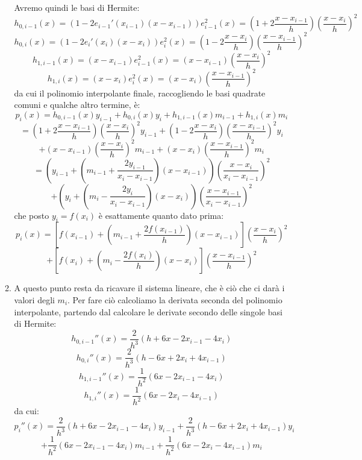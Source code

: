 \documentclass[a4paper,11pt]{article}
\begin{document}
\begin{itemize}
\begin{enumerate}
				Avremo quindi le basi di Hermite:
				$$
				h_{0,i-1}\left(x\right) = (1 - 2e_{i - 1}'(x_{i - 1})(x - x_{i-1}))e_{i-1}^2(x) 
				= \left(1+2\frac{x - x_{i-1}}{h}\right)\left(\frac{x-x_{i}}{h}\right)^{2}
				$$
				$$
				h_{0,i}\left(x\right) = (1 - 2e_{i}'(x_i)(x - x_i))e_i^2(x) 
				= \left(1-2\frac{x - x_i}{h}\right)\left(\frac{x-x_{i-1}}{h}\right)^{2}
				$$
				$$
				h_{1,i-1}\left(x\right) = (x - x_{i - 1})e_{i-1}^2(x) = \left(x-x_{i-1}\right)\left(\frac{x-x_{i}}{h}\right)^{2}
				$$
				$$
				h_{1,i}\left(x\right) = (x - x_{i})e_{i}^2(x) = \left(x-x_{i}\right)\left(\frac{x-x_{i-1}}{h}\right)^{2}
				$$
				da cui il polinomio interpolante finale, raccogliendo le basi quadrate comuni e qualche altro termine, è:
				$$
				p_i\left(x\right)=h_{0,i-1}\left(x\right)y_{i-1}+h_{0,i}\left(x\right)y_{i}+h_{1,i-1}\left(x\right)m_{i-1}+h_{1,i}\left(x\right)m_{i}
				$$
				$$
				= \left(1+2\frac{x - x_{i-1}}{h}\right)\left(\frac{x-x_{i}}{h}\right)^{2} y_{i - 1}
				+ \left(1-2\frac{x - x_i}{h}\right)\left(\frac{x-x_{i-1}}{h}\right)^{2} y_i
				$$
				$$
				+ \left(x-x_{i-1}\right)\left(\frac{x-x_{i}}{h}\right)^{2} m_{i - 1}
				+ \left(x-x_{i}\right)\left(\frac{x-x_{i-1}}{h}\right)^{2} m_i
				$$
				$$
				=\left(y_{i-1}+\left(m_{i-1}+\frac{2y_{i-1}}{x_{i}-x_{i-1}}\right)\left(x-x_{i-1}\right)\right)\left(\frac{x-x_{i}}{x_{i}-x_{i-1}}\right)^{2}
				$$
				$$
				+\left(y_{i}+\left(m_{i}-\frac{2y_{i}}{x_{i}-x_{i-1}}\right)\left(x-x_{i}\right)\right)\left(\frac{x-x_{i-1}}{x_{i}-x_{i-1}}\right)^{2}
				$$
				che posto $y_i = f(x_i)$ è esattamente quanto dato prima:
				$$
				p_i(x) = \left[ f(x_{i - 1}) + \left( m_{i - 1} + \frac{2 f(x_{i - 1})}{h} \right) (x - x_{i - 1})  \right] \left( \frac{x - x_i}{h} \right)^2
				$$
				$$
				+ \left[ f(x_{i}) + \left( m_{i} - \frac{2 f(x_{i })}{h} \right) (x - x_{i})  \right] \left( \frac{x - x_{i - 1}}{h} \right)^2
				$$

			\item
				A questo punto resta da ricavare il sistema lineare, che è ciò che ci darà i valori degli $m_i$.
				Per fare ciò calcoliamo la derivata seconda del polinomio interpolante, partendo dal calcolare le derivate secondo delle singole basi di Hermite:
				$$
				h_{0,i-1}''(x) = \frac{2}{h^{3}}\left(h+6x-2x_{i - 1}-4x_{i}\right)
				$$
				$$
				h_{0,i}''(x) = \frac{2}{h^{3}}\left(h-6x+2x_{i}+4x_{i - 1}\right)
				$$
				$$
				h_{1,i-1}''(x) = \frac{1}{h^{2}}\left(6x-2x_{i-1}-4x_{i}\right)
				$$
				$$
				h_{1, i}''(x) = \frac{1}{h^{2}}\left(6x-2x_{i}-4x_{i-1}\right)
				$$
				da cui:
				$$
				p_i''(x) = \frac{2}{h^{3}}\left(h+6x-2x_{i-1}-4x_{i}\right)y_{i-1}+\frac{2}{h^{3}}\left(h-6x+2x_{i}+4x_{i-1}\right)y_{i}
				$$
				$$
				+\frac{1}{h^{2}}\left(6x-2x_{i-1}-4x_{i}\right)m_{i-1}+\frac{1}{h^{2}}\left(6x-2x_{i}-4x_{i-1}\right)m_{i}
				$$


\end{enumerate}
\end{itemize}
\end{document}
